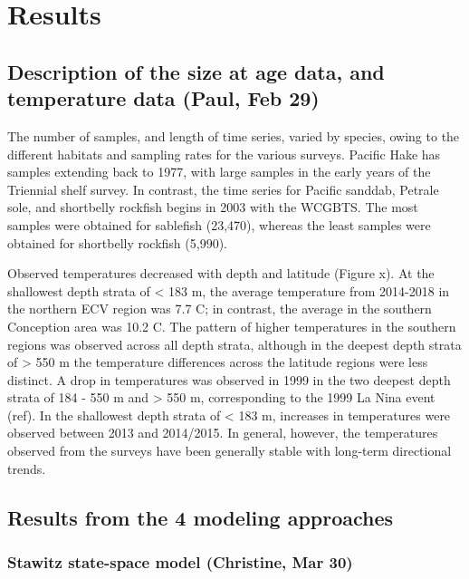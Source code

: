 \documentclass[
]{article}
\begin{document}
\hypertarget{results}{%
\section{Results}\label{results}}

\hypertarget{description-of-the-size-at-age-data-and-temperature-data-paul-feb-29}{%
\subsection{Description of the size at age data, and temperature data
(Paul, Feb
29)}\label{description-of-the-size-at-age-data-and-temperature-data-paul-feb-29}}

The number of samples, and length of time series, varied by species,
owing to the different habitats and sampling rates for the various
surveys. Pacific Hake has samples extending back to 1977, with large
samples in the early years of the Triennial shelf survey. In contrast,
the time series for Pacific sanddab, Petrale sole, and shortbelly
rockfish begins in 2003 with the WCGBTS. The most samples were obtained
for sablefish (23,470), whereas the least samples were obtained for
shortbelly rockfish (5,990).

Observed temperatures decreased with depth and latitude (Figure x). At
the shallowest depth strata of \textless{} 183 m, the average
temperature from 2014-2018 in the northern ECV region was 7.7 C; in
contrast, the average in the southern Conception area was 10.2 C. The
pattern of higher temperatures in the southern regions was observed
across all depth strata, although in the deepest depth strata of
\textgreater{} 550 m the temperature differences across the latitude
regions were less distinct. A drop in temperatures was observed in 1999
in the two deepest depth strata of 184 - 550 m and \textgreater{} 550 m,
corresponding to the 1999 La Nina event (ref). In the shallowest depth
strata of \textless{} 183 m, increases in temperatures were observed
between 2013 and 2014/2015. In general, however, the temperatures
observed from the surveys have been generally stable with long-term
directional trends.

\hypertarget{results-from-the-4-modeling-approaches}{%
\subsection{Results from the 4 modeling
approaches}\label{results-from-the-4-modeling-approaches}}

\hypertarget{stawitz-state-space-model-christine-mar-30}{%
\subsubsection{Stawitz state-space model (Christine, Mar
30)}\label{stawitz-state-space-model-christine-mar-30}}
\end{document}
